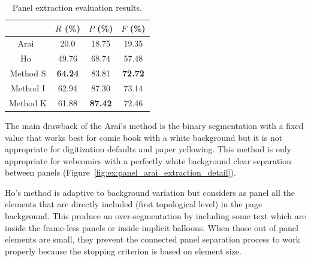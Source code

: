   \begin{table}[ht]
    \normalsize

    \centering
    \caption[Panel extraction evaluation results]{Panel extraction evaluation results.}
    \begin{tabular}{|c|c|c|c|}
          \hline
          &  $R$ (\%)  & $P$ (\%)  & $F$ (\%)     \\
          \hline
          Arai~\cite{Arai11}   & 20.0       & 18.75    & 19.35    \\
          \hline
          Ho~\cite{Ho2012}   & 49.76       & 68.74    & 57.48    \\
          \hline
          Method S          & \textbf{64.24}       & 83.81   & \bf{72.72}     \\
          \hline
          Method I          & 62.94       & 87.30   & 73.14      \\
          \hline
          Method K          & 61.88       & \textbf{87.42}     & 72.46      \\
          \hline
        \end{tabular}
    \label{tab:panel_extraction_comparision_results}
  \end{table}%


The main drawback of the Arai's method is the binary segmentation with a fixed value that works best for comic book with a white background but it is not appropriate for digitization defaults and paper yellowing.
This method is only appropriate for webcomics with a perfectly white background clear separation between panels (Figure~\ref{fig:ex:panel_arai_extraction_detail}).

Ho's method is adaptive to background variation but considers as panel all the elements that are directly included (first topological level) in the page background.
This produce an over-segmentation by including some text which are inside the frame-less panels or inside implicit balloons.
When those out of panel elements are small, they prevent the connected panel separation process to work properly because the stopping criterion is based on element size.

